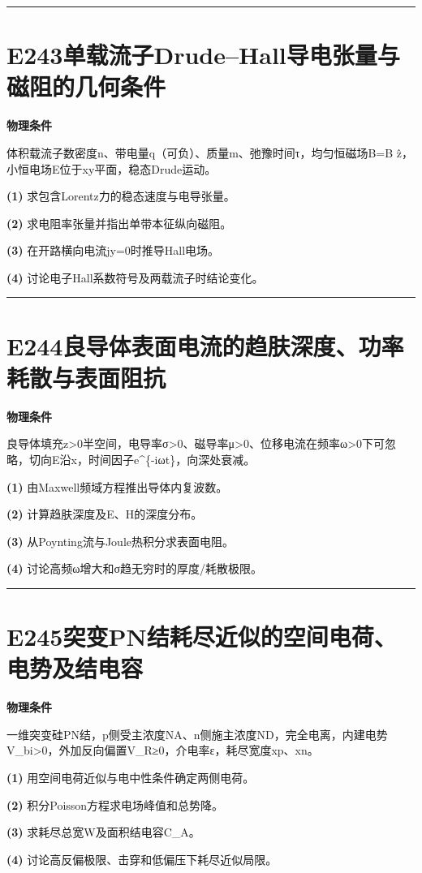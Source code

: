 \documentclass[UTF8,a4paper,11pt,oneside,openany]{ctexbook}
\begin{document}
\par\bigskip\hrule\bigskip
\section*{E243\quad 单载流子Drude–Hall导电张量与磁阻的几何条件}
\textbf{物理条件}\par 体积载流子数密度n、带电量q（可负）、质量m、弛豫时间τ，均匀恒磁场B=B ẑ，小恒电场E位于xy平面，稳态Drude运动。
\par\noindent\textbf{(1)} 求包含Lorentz力的稳态速度与电导张量。
\par\noindent\textbf{(2)} 求电阻率张量并指出单带本征纵向磁阻。
\par\noindent\textbf{(3)} 在开路横向电流jy=0时推导Hall电场。
\par\noindent\textbf{(4)} 讨论电子Hall系数符号及两载流子时结论变化。

\par\bigskip\hrule\bigskip
\section*{E244\quad 良导体表面电流的趋肤深度、功率耗散与表面阻抗}
\textbf{物理条件}\par 良导体填充z>0半空间，电导率σ>0、磁导率μ>0、位移电流在频率ω>0下可忽略，切向E沿x，时间因子e\textasciicircum{}\{-iωt\}，向深处衰减。
\par\noindent\textbf{(1)} 由Maxwell频域方程推出导体内复波数。
\par\noindent\textbf{(2)} 计算趋肤深度及E、H的深度分布。
\par\noindent\textbf{(3)} 从Poynting流与Joule热积分求表面电阻。
\par\noindent\textbf{(4)} 讨论高频ω增大和σ趋无穷时的厚度/耗散极限。

\par\bigskip\hrule\bigskip
\section*{E245\quad 突变PN结耗尽近似的空间电荷、电势及结电容}
\textbf{物理条件}\par 一维突变硅PN结，p侧受主浓度NA、n侧施主浓度ND，完全电离，内建电势V\_bi>0，外加反向偏置V\_R≥0，介电率ε，耗尽宽度xp、xn。
\par\noindent\textbf{(1)} 用空间电荷近似与电中性条件确定两侧电荷。
\par\noindent\textbf{(2)} 积分Poisson方程求电场峰值和总势降。
\par\noindent\textbf{(3)} 求耗尽总宽W及面积结电容C\_A。
\par\noindent\textbf{(4)} 讨论高反偏极限、击穿和低偏压下耗尽近似局限。
\end{document}
